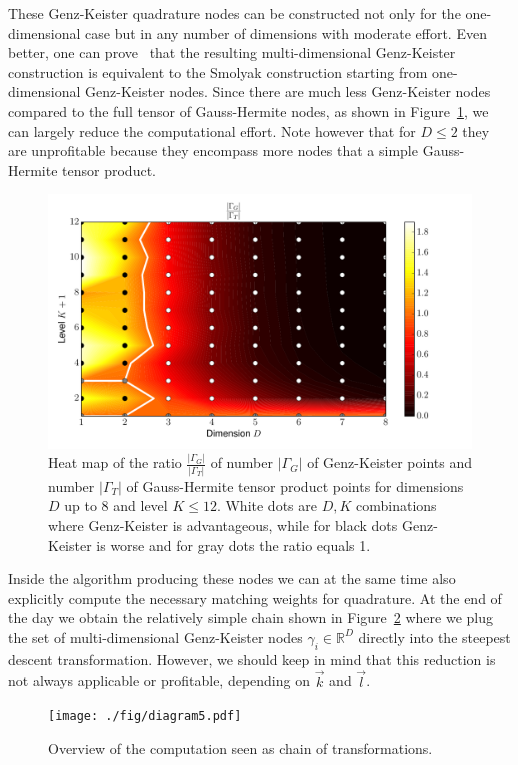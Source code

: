 \documentclass[a4paper,10pt]{article}
\begin{document}
These Genz-Keister quadrature nodes can be constructed not only
for the one-dimensional case but in any number of dimensions
with moderate effort. Even better, one can prove~\cite{novak_ritter} that
the resulting multi-dimensional Genz-Keister construction is equivalent to the
Smolyak construction starting from one-dimensional Genz-Keister nodes.
Since there are much less Genz-Keister nodes compared to the full tensor
of Gauss-Hermite nodes, as shown in Figure~\ref{fig:gk_hermitephy_ratio},
we can largely reduce the computational effort. Note however that for $D \leq 2$
they are unprofitable because they encompass more nodes that a simple Gauss-Hermite
tensor product.

\begin{figure}[h]
  \centering
  \includegraphics[width=0.8\linewidth]{./fig/gk_hermitephy_ratio.pdf}
  \caption{Heat map of the ratio $\frac{|\Gamma_{G}|}{|\Gamma_T|}$ of number $|\Gamma_G|$
  of Genz-Keister points and number $|\Gamma_T|$ of Gauss-Hermite tensor product
  points for dimensions $D$ up to 8 and level $K \leq 12$. White dots are $D,K$
  combinations where Genz-Keister is advantageous, while for black dots
  Genz-Keister is worse and for gray dots the ratio equals 1.}
  \label{fig:gk_hermitephy_ratio}
\end{figure}

Inside the algorithm producing these nodes we can at the same time also
explicitly compute the necessary matching weights for quadrature.
At the end of the day we obtain the relatively simple chain shown
in Figure~\ref{fig:transformation_chain_5} where we plug the set of multi-dimensional
Genz-Keister nodes $\gamma_i \in \mathbb{R}^D$ directly into the steepest
descent transformation. However, we should keep in mind that this reduction
is not always applicable or profitable, depending on $\vec{k}$ and $\vec{l}$.

\begin{figure}[h!]
  \centering
  \texttt{[image: ./fig/diagram5.pdf]}
  \caption{Overview of the computation seen as chain of transformations.}
  \label{fig:transformation_chain_5}
\end{figure}
\end{document}
